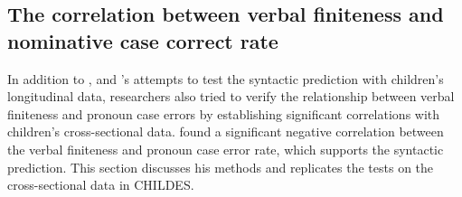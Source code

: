 \subsection{The correlation between verbal finiteness and nominative case correct rate}
\label{section:rispoli20051}

In addition to \cite{schutze1996subject}, \cite{schutze1997} and \cite{pine2005testing}'s attempts to test the syntactic prediction with children's longitudinal data, researchers also tried to verify the relationship between verbal finiteness and pronoun case errors by establishing significant correlations with children's cross-sectional data. \cite{rispoli2005} found a significant negative correlation between the verbal finiteness and pronoun case error rate, which supports the syntactic prediction. This section discusses his methods and replicates the tests on the cross-sectional data in CHILDES. 

